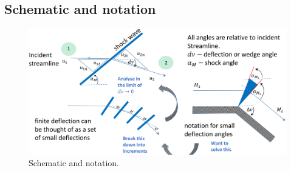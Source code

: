 \documentclass[class=report, crop=false, 12pt,a4paper]{standalone}
\begin{document}
\subsection{Schematic and notation}
\begin{figure}[H]
    \centering
    \includegraphics[width = \textwidth]{../img/diagram24.png}
    \caption{Schematic and notation.}
\end{figure}
\end{document}

